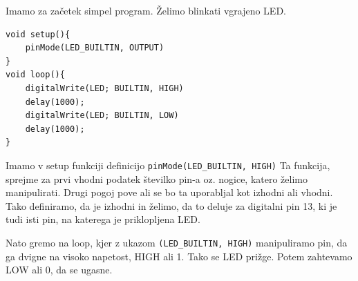 \documentclass[a4paper, 12pt]{article}
\begin{document}
Imamo za začetek simpel program. Želimo blinkati vgrajeno LED.

\begin{lstlisting}
void setup(){
	pinMode(LED_BUILTIN, OUTPUT)
}
void loop(){
	digitalWrite(LED; BUILTIN, HIGH)
	delay(1000);
	digitalWrite(LED; BUILTIN, LOW)
	delay(1000);
}
\end{lstlisting}

Imamo v setup funkciji definicijo \textcolor{dkgreen}{\texttt{pinMode(LED\_BUILTIN, HIGH)}} Ta funkcija, sprejme za prvi vhodni podatek številko pin-a oz. nogice, katero želimo manipulirati. Drugi pogoj pove ali se bo ta uporabljal kot izhodni ali vhodni. Tako definiramo, da je izhodni in želimo, da to deluje za digitalni pin 13, ki je tudi isti pin, na katerega je priklopljena LED.\

Nato gremo na loop, kjer z ukazom \textcolor{dkgreen}{\texttt{(LED\_BUILTIN, HIGH)}} manipuliramo pin, da ga dvigne na visoko napetost, HIGH ali 1. Tako se LED prižge. Potem zahtevamo LOW ali 0, da se ugasne.
\end{document}
